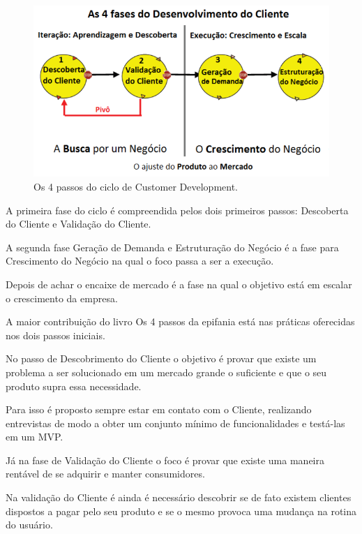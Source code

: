 \begin{figure}[htb]
\centering
\includegraphics[width=15cm]{figuras/customerdevelopment}
\caption{\label{fig:customerdevelopment}Os 4 passos do ciclo de Customer Development.}
\end{figure}
\par A primeira fase do ciclo é compreendida pelos dois primeiros passos: Descoberta do Cliente e Validação do Cliente.
\par A segunda fase Geração de Demanda e Estruturação do Negócio é a fase para Crescimento do Negócio na qual o foco passa a ser a execução.
\par Depois de achar o encaixe de mercado é a fase na qual o objetivo está em escalar o crescimento da empresa.
\par A maior contribuição do livro Os 4 passos da epifania \cite{blank:03} está nas práticas oferecidas nos dois passos iniciais.
\par No passo de Descobrimento do Cliente o objetivo é provar que existe um problema a ser solucionado em um mercado grande o suficiente e que o seu produto supra essa necessidade.
\par Para isso é proposto sempre estar em contato com o Cliente, realizando entrevistas de modo a obter um conjunto mínimo de funcionalidades e testá-las em um MVP.
\par Já na fase de Validação do Cliente o foco é provar que existe uma maneira rentável de se adquirir e manter consumidores.
\par Na validação do Cliente é ainda é necessário descobrir se de fato existem clientes dispostos a pagar pelo seu produto e se o mesmo provoca uma mudança na rotina do usuário.
